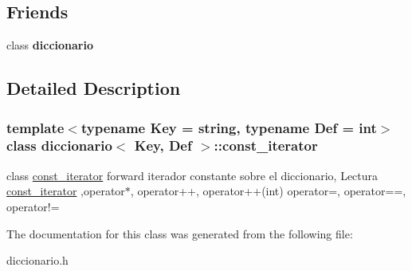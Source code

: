 \subsection*{Friends}
\begin{DoxyCompactItemize}
\item 
\hypertarget{classdiccionario_1_1const__iterator_a44955070f60117521fa6b406a83e6d4d}{class {\bfseries diccionario}}\label{classdiccionario_1_1const__iterator_a44955070f60117521fa6b406a83e6d4d}

\end{DoxyCompactItemize}


\subsection{Detailed Description}
\subsubsection*{template$<$typename Key = string, typename Def = int$>$class diccionario$<$ Key, Def $>$\-::const\-\_\-iterator}

class \hyperlink{classdiccionario_1_1const__iterator}{const\-\_\-iterator} forward iterador constante sobre el diccionario, Lectura \hyperlink{classdiccionario_1_1const__iterator}{const\-\_\-iterator} ,operator$\ast$, operator++, operator++(int) operator=, operator==, operator!= 

The documentation for this class was generated from the following file\-:\begin{DoxyCompactItemize}
\item 
diccionario.\-h\end{DoxyCompactItemize}

